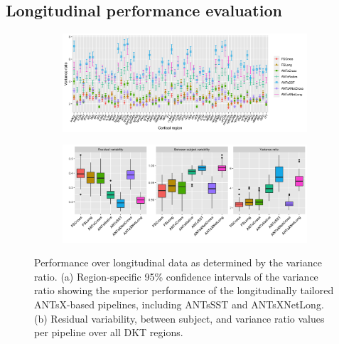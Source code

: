 \documentclass[12pt,]{article}
\begin{document}
\hypertarget{longitudinal-performance-evaluation}{%
\subsection*{Longitudinal performance
evaluation}\label{longitudinal-performance-evaluation}}

\begin{figure}[!htb]
  \centering
  \begin{subfigure}{0.95\textwidth}
    \centering
    \includegraphics[width=1.0\linewidth]{Figures/variance.ratio_FINALX.png}
    \caption{}
  \end{subfigure}
  \begin{subfigure}{0.95\textwidth}
    \centering
    \includegraphics[width=1\linewidth]{Figures/allData_FINALX2.png}
    \caption{}
  \end{subfigure}
  \caption{Performance over longitudinal data as determined by the variance ratio.
    (a) Region-specific 95\% confidence intervals of the variance ratio showing the
    superior performance of the longitudinally tailored ANTsX-based pipelines, including
    ANTsSST and ANTsXNetLong. (b) Residual variability, between subject, and variance ratio
    values per pipeline over all DKT regions. }
\label{fig:longeval1}
\end{figure}
\end{document}

